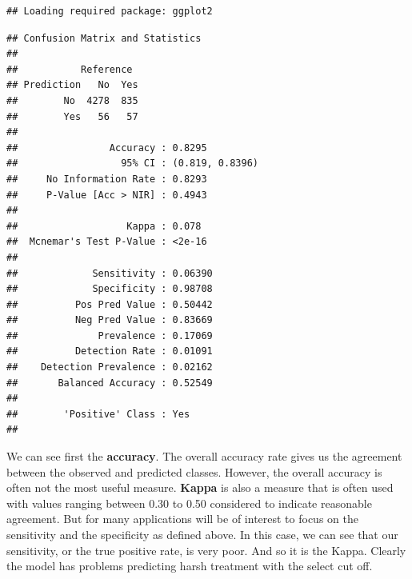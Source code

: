 \documentclass[]{book}
\newenvironment{Shaded}{\begin{snugshade}}{\end{snugshade}}
\newcommand{\CommentTok}[1]{\textcolor[rgb]{0.56,0.35,0.01}{\textit{#1}}}
\newcommand{\DataTypeTok}[1]{\textcolor[rgb]{0.13,0.29,0.53}{#1}}
\newcommand{\KeywordTok}[1]{\textcolor[rgb]{0.13,0.29,0.53}{\textbf{#1}}}
\newcommand{\NormalTok}[1]{#1}
\newcommand{\OperatorTok}[1]{\textcolor[rgb]{0.81,0.36,0.00}{\textbf{#1}}}
\newcommand{\StringTok}[1]{\textcolor[rgb]{0.31,0.60,0.02}{#1}}
\theoremstyle{definition}
\theoremstyle{definition}
\theoremstyle{definition}
\theoremstyle{remark}
\begin{document}
\begin{verbatim}
## Loading required package: ggplot2
\end{verbatim}

\begin{Shaded}
\end{Shaded}

\begin{verbatim}
## Confusion Matrix and Statistics
## 
##           Reference
## Prediction   No  Yes
##        No  4278  835
##        Yes   56   57
##                                          
##                Accuracy : 0.8295         
##                  95% CI : (0.819, 0.8396)
##     No Information Rate : 0.8293         
##     P-Value [Acc > NIR] : 0.4943         
##                                          
##                   Kappa : 0.078          
##  Mcnemar's Test P-Value : <2e-16         
##                                          
##             Sensitivity : 0.06390        
##             Specificity : 0.98708        
##          Pos Pred Value : 0.50442        
##          Neg Pred Value : 0.83669        
##              Prevalence : 0.17069        
##          Detection Rate : 0.01091        
##    Detection Prevalence : 0.02162        
##       Balanced Accuracy : 0.52549        
##                                          
##        'Positive' Class : Yes            
## 
\end{verbatim}

We can see first the \textbf{accuracy}. The overall accuracy rate gives
us the agreement between the observed and predicted classes. However,
the overall accuracy is often not the most useful measure.
\textbf{Kappa} is also a measure that is often used with values ranging
between 0.30 to 0.50 considered to indicate reasonable agreement. But
for many applications will be of interest to focus on the sensitivity
and the specificity as defined above. In this case, we can see that our
sensitivity, or the true positive rate, is very poor. And so it is the
Kappa. Clearly the model has problems predicting harsh treatment with
the select cut off.
\end{document}
